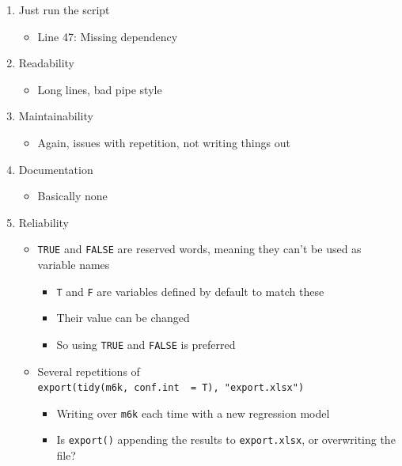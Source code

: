 \documentclass[
]{article}
\providecommand{\tightlist}{%
  \setlength{\itemsep}{0pt}\setlength{\parskip}{0pt}}
\begin{document}
\begin{enumerate}
\def\labelenumi{\arabic{enumi}.}
\setcounter{enumi}{-1}
\tightlist
\item
  Just run the script

  \begin{itemize}
  \tightlist
  \item
    Line 47: Missing dependency
  \end{itemize}
\item
  Readability

  \begin{itemize}
  \tightlist
  \item
    Long lines, bad pipe style
  \end{itemize}
\item
  Maintainability

  \begin{itemize}
  \tightlist
  \item
    Again, issues with repetition, not writing things out
  \end{itemize}
\item
  Documentation

  \begin{itemize}
  \tightlist
  \item
    Basically none
  \end{itemize}
\item
  Reliability

  \begin{itemize}
  \tightlist
  \item
    \texttt{TRUE} and \texttt{FALSE} are reserved words, meaning they can't be used as variable names

    \begin{itemize}
    \tightlist
    \item
      \texttt{T} and \texttt{F} are variables defined by default to match these
    \item
      Their value can be changed
    \item
      So using \texttt{TRUE} and \texttt{FALSE} is preferred
    \end{itemize}
  \item
    Several repetitions of \texttt{export(tidy(m6k,\ conf.int\ \ =\ T),\ "export.xlsx")}

    \begin{itemize}
    \tightlist
    \item
      Writing over \texttt{m6k} each time with a new regression model
    \item
      Is \texttt{export()} appending the results to \texttt{export.xlsx}, or overwriting the file?
    \end{itemize}
  \end{itemize}
\end{enumerate}
\end{document}
